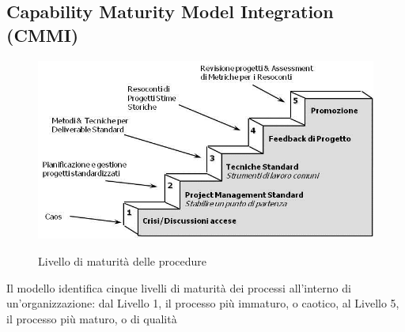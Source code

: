 \subsection{Capability Maturity Model Integration (CMMI)}
\begin{figure} [H]
\centering
     \includegraphics[scale=0.8]{../modello/img/CMMI}\\
     \caption{Livello di maturità delle procedure}\label{fig:4}
\end{figure}
Il modello identifica cinque livelli di maturità dei processi all'interno di un'organizzazione: dal Livello 1, il processo più immaturo, o caotico, al Livello 5, il processo più maturo, o di qualità
